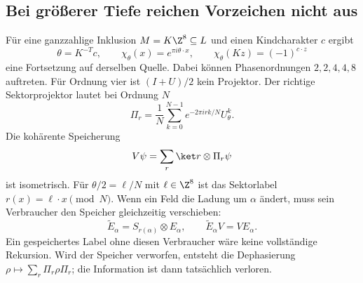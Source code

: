 \subsection{Bei größerer Tiefe reichen Vorzeichen nicht aus}
Für eine ganzzahlige Inklusion $M=K\Z^8\subseteq L$ und einen Kindcharakter $c$ ergibt
\begin{equation}
\theta=K^{-T}c,\qquad
\chi_\theta(x)=e^{\pi i\theta\cdot x},\qquad
\chi_\theta(Kz)=(-1)^{c\cdot z}
\end{equation}
eine Fortsetzung auf derselben Quelle. Dabei können Phasenordnungen $2,2,4,4,8$ auftreten. Für Ordnung vier ist $(I+U)/2$ kein Projektor. Der richtige Sektorprojektor lautet bei Ordnung $N$
\begin{equation}
\Pi_r=\frac1N\sum_{k=0}^{N-1}e^{-2\pi i rk/N}U_\theta^k.
\end{equation}
Die kohärente Speicherung
\begin{equation}
V\psi=\sum_r\ket r\otimes\Pi_r\psi
\end{equation}
ist isometrisch. Für $\theta/2=\ell/N$ mit $\ell\in\Z^8$ ist das Sektorlabel $r(x)=\ell\cdot x\pmod N$. Wenn ein Feld die Ladung um $\alpha$ ändert, muss sein Verbraucher den Speicher gleichzeitig verschieben:
\begin{equation}
\widetilde E_\alpha=S_{r(\alpha)}\otimes E_\alpha,
\qquad\widetilde E_\alpha V=VE_\alpha.
\end{equation}
Ein gespeichertes Label ohne diesen Verbraucher wäre keine vollständige Rekursion. Wird der Speicher verworfen, entsteht die Dephasierung $\rho\mapsto\sum_r\Pi_r\rho\Pi_r$; die Information ist dann tatsächlich verloren.

\begin{center}
\end{center}


